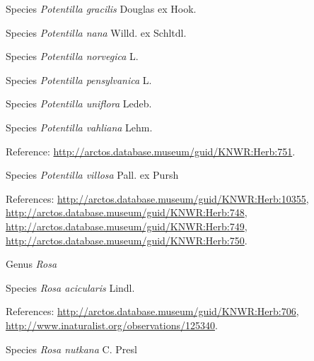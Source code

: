 \documentclass[9pt, article]{memoir}
\begin{document}
\begin{multicols}{2}
\vspace{6pt}\noindent\hspace{36pt}Species \textit{Potentilla gracilis} Douglas ex Hook.


\vspace{6pt}\noindent\hspace{36pt}Species \textit{Potentilla nana} Willd. ex Schltdl.


\vspace{6pt}\noindent\hspace{36pt}Species \textit{Potentilla norvegica} L.


\vspace{6pt}\noindent\hspace{36pt}Species \textit{Potentilla pensylvanica} L.


\vspace{6pt}\noindent\hspace{36pt}Species \textit{Potentilla uniflora} Ledeb.


\vspace{6pt}\noindent\hspace{36pt}Species \textit{Potentilla vahliana} Lehm.


\vspace{6pt}Reference: 
\url{http://arctos.database.museum/guid/KNWR:Herb:751}.

\vspace{6pt}\noindent\hspace{36pt}Species \textit{Potentilla villosa} Pall. ex Pursh


\vspace{6pt}References: 
\url{http://arctos.database.museum/guid/KNWR:Herb:10355}, 
\url{http://arctos.database.museum/guid/KNWR:Herb:748}, 
\url{http://arctos.database.museum/guid/KNWR:Herb:749}, 
\url{http://arctos.database.museum/guid/KNWR:Herb:750}.

\vspace{6pt}\noindent\hspace{30pt}Genus \textit{Rosa}


\vspace{6pt}\noindent\hspace{36pt}Species \textit{Rosa acicularis} Lindl.


\vspace{6pt}References: 
\url{http://arctos.database.museum/guid/KNWR:Herb:706}, 
\url{http://www.inaturalist.org/observations/125340}.

\vspace{6pt}\noindent\hspace{36pt}Species \textit{Rosa nutkana} C. Presl



\end{multicols}
\end{document}
